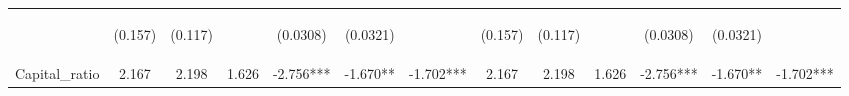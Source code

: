 \documentclass[]{article}
\begin{document}
\begin{center}
\begin{tabular}{lcccccccccccc}
\vspace{4pt} & \begin{footnotesize}(0.157)\end{footnotesize} & \begin{footnotesize}(0.117)\end{footnotesize} & \begin{footnotesize}\end{footnotesize} & \begin{footnotesize}(0.0308)\end{footnotesize} & \begin{footnotesize}(0.0321)\end{footnotesize} & \begin{footnotesize}\end{footnotesize} & \begin{footnotesize}(0.157)\end{footnotesize} & \begin{footnotesize}(0.117)\end{footnotesize} & \begin{footnotesize}\end{footnotesize} & \begin{footnotesize}(0.0308)\end{footnotesize} & \begin{footnotesize}(0.0321)\end{footnotesize} & \begin{footnotesize}\end{footnotesize} \\
Capital\_ratio & 2.167 & 2.198 & 1.626 & -2.756*** & -1.670** & -1.702*** & 2.167 & 2.198 & 1.626 & -2.756*** & -1.670** & -1.702*** \\

\end{tabular}
\end{center}
\end{document}
